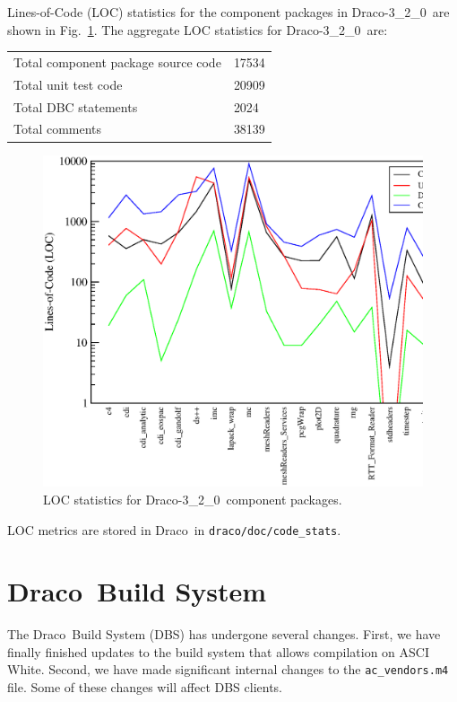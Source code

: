 \documentclass[11pt]{nmemo}
\newcommand{\draco}{Draco}
\newcommand{\dracor}{\draco-3\_2\_0}
\begin{document}
Lines-of-Code (LOC) statistics for the component packages in \dracor\ 
are shown in Fig.~\ref{fig:stats}.  The aggregate LOC statistics for
\dracor\ are:
\begin{center}
  \begin{tabular}{|l|l|} \hline
    Total component package source code & 17534 \\
    Total unit test code & 20909 \\
    Total DBC statements & 2024 \\
    Total comments & 38139 \\
    \hline
  \end{tabular}
\end{center}
\begin{figure}
  \label{fig:stats}
  \centerline{
    \includegraphics[width=6in]{loc-3_2_0.eps}}
  \caption{LOC statistics for \dracor\ component packages.}
\end{figure}

LOC metrics are stored in \draco\ in \texttt{draco/doc/code\_stats}.


\section{\draco\ Build System}

The \draco\ Build System (DBS) has undergone several changes.  First,
we have finally finished updates to the build system that allows
compilation on ASCI White.  Second, we have made significant internal
changes to the \texttt{ac\_vendors.m4} file.  Some of these changes
will affect DBS clients. 
\end{document}
